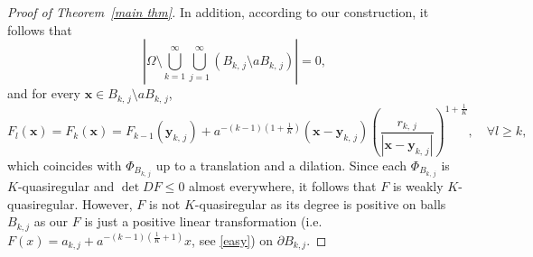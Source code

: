 \documentclass[reqno,11pt]{amsart}
\numberwithin{equation}{section}
\theoremstyle{remark}
\begin{document}
\begin{proof}[Proof of Theorem~\ref{main thm}]
In addition, according to our construction, it follows that
\begin{equation}\label{zero null set}
    \left|\Omega\setminus \bigcup_{k=1}^\infty\bigcup_{j=1}^\infty (B_{k,\,j}\setminus aB_{k,\,j})\right|=0,
\end{equation} 
and for every $\mathbf x\in B_{k,\,j}\setminus aB_{k,\,j}$,
\begin{equation}\label{easy}
F_{l}(\mathbf x) = F_k(\mathbf x)= F_{k-1}(\mathbf{y}_{k,\,j})+  a^{-(k-1) (1+\frac 1 K)}(\mathbf x-\mathbf y_{k,\,j})\left(\frac{r_{k,\,j}}{|\mathbf x-\mathbf y_{k,\,j}|}\right)^{1+\frac 1 K}, \quad \forall l\ge k,
\end{equation}
which coincides with $\Phi_{B_{k,\,j}}$ up to a translation and a dilation. 
Since each $\Phi_{B_{k,\,j}}$ is $K$-quasiregular and $\det DF\le 0$ almost everywhere, it follows that $F$ is weakly $K$-quasiregular.  However, $F$ is not $K$-quasiregular as its degree is positive on balls $B_{k,j}$ as our $F$ is just a positive linear transformation (i.e. $F(x)=a_{k,j}+a^{-(k-1)(\frac{1}{K}+1)} x$, see \eqref{easy}) on $\partial B_{k,j}$. 

\medskip


\end{proof}
\end{document}
